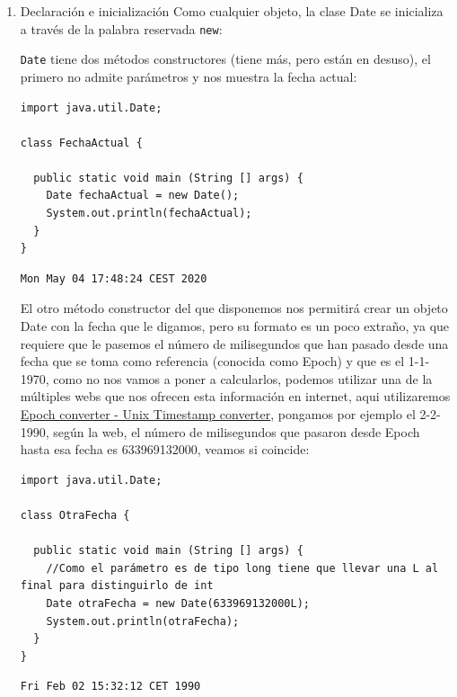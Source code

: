 \documentclass[11pt]{article}
\begin{document}
\begin{enumerate}
\item Declaración e inicialización
\label{sec:orgfb5f594}
Como cualquier objeto, la clase Date se inicializa a través de la palabra reservada \texttt{new}:

\texttt{Date} tiene dos métodos constructores (tiene más, pero están en desuso), el primero no admite parámetros y nos muestra la fecha actual:

\begin{verbatim}
import java.util.Date;

class FechaActual {

  public static void main (String [] args) {
    Date fechaActual = new Date();
    System.out.println(fechaActual);
  }
}
\end{verbatim}

\begin{verbatim}
Mon May 04 17:48:24 CEST 2020
\end{verbatim}


El otro método constructor del que disponemos nos permitirá crear un objeto Date con la fecha que le digamos, pero su formato es un poco extraño, ya que requiere que le pasemos el número de milisegundos que han pasado desde una fecha que se toma como referencia (conocida como Epoch) y que es el 1-1-1970, como no nos vamos a poner a calcularlos, podemos utilizar una de la múltiples webs que nos ofrecen esta información en internet, aqui utilizaremos \href{https://www.epochconverter.com}{Epoch converter - Unix Timestamp converter}, pongamos por ejemplo el 2-2-1990, según la web, el número de milisegundos que pasaron desde Epoch hasta esa fecha es 633969132000, veamos si coincide:

\begin{verbatim}
import java.util.Date;

class OtraFecha {

  public static void main (String [] args) {
    //Como el parámetro es de tipo long tiene que llevar una L al final para distinguirlo de int
    Date otraFecha = new Date(633969132000L);
    System.out.println(otraFecha);
  }
}
\end{verbatim}

\begin{verbatim}
Fri Feb 02 15:32:12 CET 1990
\end{verbatim}


\end{enumerate}
\end{document}
